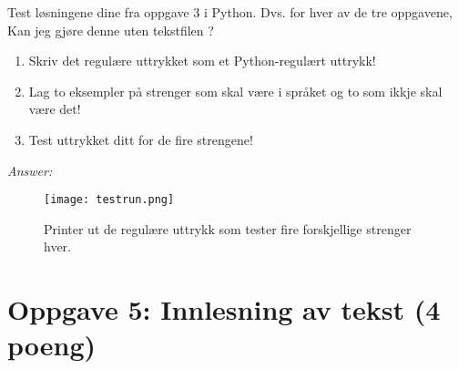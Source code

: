 \documentclass[a4paper, 12pt,]{article}             %
\begin{document}
Test løsningene dine fra oppgave 3 i Python. Dvs. for hver av de tre oppgavene, Kan jeg gjøre denne uten tekstfilen ?

\begin{enumerate}
\item Skriv det regulære uttrykket som et Python-regulært uttrykk! 
\item Lag to eksempler på strenger som skal være i språket og to som ikkje skal være det! 
\item Test uttrykket ditt for de fire strengene! 
\end{enumerate}


\textit{Answer:}

\begin{figure}[tbh]
    \centering
    \texttt{[image: testrun.png]}
    \caption{Printer ut de regulære uttrykk som tester fire forskjellige strenger hver.}
    \label{fig:awesome_image}
  \end{figure}

\section*{Oppgave 5: Innlesning av tekst (4 poeng)}
\end{document}
